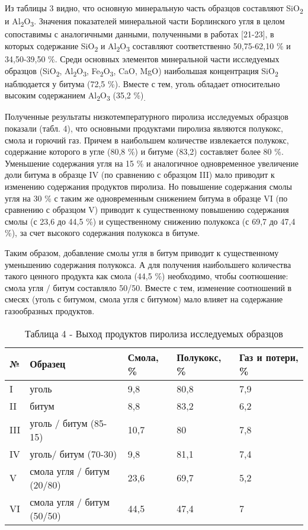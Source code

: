 \begin{multicols}{2}
Из таблицы 3 видно, что основную минеральную часть образцов составляют
SiO\textsubscript{2} и Al\textsubscript{2}O\textsubscript{3}. Значения
показателей минеральной части Борлинского угля в целом сопоставимы с
аналогичными данными, полученными в работах {[}21-23{]}, в которых
содержание SiO\textsubscript{2} и Al\textsubscript{2}O\textsubscript{3}
составляют соответственно 50,75-62,10 \% и 34,50-39,50 \%. Среди
основных элементов минеральной части исследуемых образцов
(SiO\textsubscript{2}, Al\textsubscript{2}O\textsubscript{3},
Fe\textsubscript{2}O\textsubscript{3}, CaO, MgO) наибольшая концентрация
SiO\textsubscript{2} наблюдается у битума (72,5 \%). Вместе с тем, уголь
обладает относительно высоким содержанием
Al\textsubscript{2}O\textsubscript{3} (35,2 \%)\textsubscript{.}

Полученные результаты низкотемпературного пиролиза исследуемых образцов
показали (табл. 4), что основными продуктами пиролиза являются полукокс,
смола и горючий газ. Причем в наибольшем количестве извлекается
полукокс, содержание которого в угле (80,8 \%) и битуме (83,2)
составляет более 80 \%. Уменьшение содержания угля на 15 \% и
аналогичное одновременное увеличение доли битума в образце IV (по
сравнению с образцом III) мало приводит к изменению содержания продуктов
пиролиза. Но повышение содержания смолы угля на 30 \% с таким же
одновременным снижением битума в образце VI (по сравнению с образцом V)
приводит к существенному повышению содержания смолы (с 23,6 до 44,5 \%)
и существенному снижению полукокса (с 69,7 до 47,4 \%), за счет высокого
содержания полукокса в битуме.

Таким образом, добавление смолы угля в битум приводит к существенному
уменьшению содержания полукокса. А для получения наибольшего количества
такого ценного продукта как смола (44,5 \%) необходимо, чтобы
соотношение: смола угля / битум составляло 50/50. Вместе с тем,
изменение соотношений в смесях (уголь с битумом, смола угля с битумом)
мало влияет на содержание газообразных продуктов.
\end{multicols}

\begin{table}[H]
\caption*{Таблица 4 - Выход продуктов пиролиза исследуемых образцов}
\centering
\begin{tabular}{|l|l|l|l|l|}
\hline
№ & Образец & Смола, \% & Полукокс, \% & Газ и потери, \% \\ \hline
I & уголь & 9,8 & 80,8 & 7,9 \\ \hline
II & битум & 8,8 & 83,2 & 6,2 \\ \hline
III & уголь / битум (85-15) & 10,7 & 80 & 7,8 \\ \hline
IV & уголь/ битум (70-30) & 9,8 & 81,1 & 7,4 \\ \hline
V & смола угля / битум (20/80) & 23,6 & 69,7 & 5,2 \\ \hline
VI & смола угля / битум (50/50) & 44,5 & 47,4 & 7 \\ \hline
\end{tabular}
\end{table}

